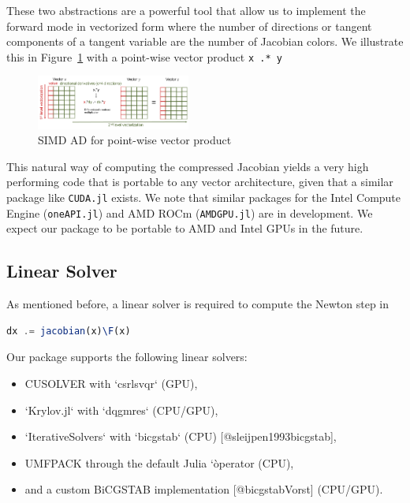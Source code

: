 \documentclass{juliacon}
\newcommand{\reffig}[1]{Figure~\ref{#1}}
\begin{document}
These two abstractions are a powerful tool that allow us to implement the
forward mode in vectorized form where the number of directions or tangent
components of a tangent variable are the number of Jacobian colors. We
illustrate this in \reffig{fig:simd} with a point-wise vector product \lstinline{x .* y}

\begin{figure}
    \centering
    \includegraphics[width=0.45\textwidth]{figures/simd.png}
    \caption{SIMD AD for point-wise vector product}
    \label{fig:simd}
\end{figure}

This natural way of computing the compressed Jacobian yields a very high
performing code that is portable to any vector architecture, given that a
similar package like \lstinline{CUDA.jl} exists. We note that similar packages for the
Intel Compute Engine (\lstinline{oneAPI.jl}) and AMD ROCm (\lstinline{AMDGPU.jl}) are in development.
We expect our package to be portable to AMD and Intel GPUs in the future.

\subsection{Linear Solver}

As mentioned before, a linear solver is required to compute the Newton step in

\begin{lstlisting}[language = Julia]
dx .= jacobian(x)\F(x)
\end{lstlisting}

Our package supports the following linear solvers:

\begin{itemize}
    \item CUSOLVER with `csrlsvqr` (GPU),
    \item `Krylov.jl` with `dqgmres` (CPU/GPU),
    \item `IterativeSolvers` with `bicgstab` (CPU) [@sleijpen1993bicgstab],
    \item UMFPACK through the default Julia `\` operator (CPU),
    \item and a custom BiCGSTAB implementation [@bicgstabVorst] (CPU/GPU).
\end{itemize}
\end{document}
